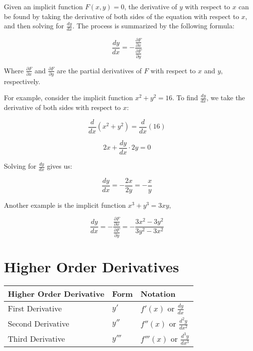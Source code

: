Given an implicit function $F(x,y) = 0$, the derivative of $y$ with respect to 
$x$ can be found by taking the derivative of both sides of the equation with 
respect to $x$, and then solving for $\frac{dy}{dx}$. The process is summarized 
by the following formula:

$$\frac{dy}{dx} = 
-\frac{\frac{\partial F}{\partial x}}{\frac{\partial F}{\partial y}}$$

Where $\frac{\partial F}{\partial x}$ and $\frac{\partial F}{\partial y}$ are 
the partial derivatives of $F$ with respect to $x$ and $y$, respectively.

For example, consider the implicit function $x^2 + y^2 = 16$. To find 
$\frac{dy}{dx}$, we take the derivative of both sides with respect to $x$:

$$\frac{d}{dx}(x^2 + y^2) = \frac{d}{dx}(16)$$

$$2x + \frac{dy}{dx} \cdot 2y = 0$$

Solving for $\frac{dy}{dx}$ gives us:

$$\frac{dy}{dx} = -\frac{2x}{2y} = -\frac{x}{y}$$

Another example is the implicit function $x^3 + y^3 = 3xy$,

$$\frac{dy}{dx} 
= -\frac{\frac{\partial F}{\partial x}}{\frac{\partial F}{\partial y}} 
= -\frac{3x^2 - 3y^2}{3y^2 - 3x^2}$$


\section{Higher Order Derivatives}
\begin{table}[h]
  \centering
  \renewcommand{\arraystretch}{1.7}
  \begin{tabular}{p{5cm}p{3cm}p{3cm}}
  \toprule
  \textbf{Higher Order Derivative} & \textbf{Form} & \textbf{Notation} \\ \hline
  First Derivative & $y'$ & $f'(x)$ or $\frac{dy}{dx}$ \\ 
  \hline
  Second Derivative & $y''$ & $f''(x)$ or $\frac{d^2y}{dx^2}$ \\ 
  \hline
  Third Derivative & $y'''$ & $f'''(x)$ or $\frac{d^3y}{dx^3}$ \\ \bottomrule
  \end{tabular}
  \end{table}
